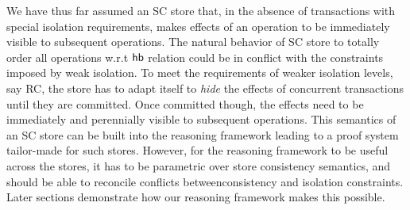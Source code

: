 We have thus far assumed an SC store that, in the absence of
transactions with special isolation requirements, makes effects of an
operation to be immediately visible to subsequent operations. The
natural behavior of SC store to totally order all operations w.r.t
$\textsf{hb}$ relation could be in conflict with the constraints imposed by
weak isolation. To meet the requirements of weaker isolation levels,
say RC, the store has to adapt itself to \emph{hide} the effects of
concurrent transactions until they are committed. Once committed
though, the effects need to be immediately and perennially visible to
subsequent operations. This semantics of an SC store can be built into
the reasoning framework leading to a proof system tailor-made for such
stores. However, for the reasoning framework to be useful across the
stores, it has to be parametric over store consistency semantics, and
should be able to reconcile conflicts betweenconsistency and isolation
constraints. Later sections demonstrate how our reasoning framework
makes this possible.
